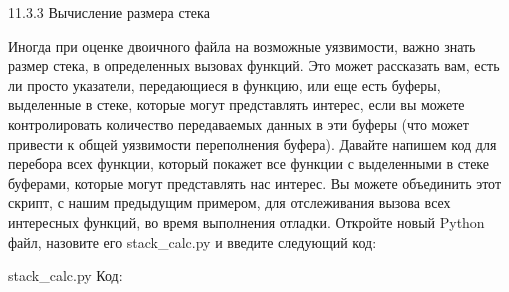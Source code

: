 \documentclass[12pt]{book}
\begin{document}
11.3.3 Вычисление размера стека

Иногда при оценке двоичного файла на возможные уязвимости, важно знать размер стека, в определенных вызовах функций. Это может рассказать вам, есть ли просто указатели, передающиеся в функцию, или еще есть буферы, выделенные в стеке, которые могут представлять интерес, если вы можете контролировать количество передаваемых данных в эти буферы (что может привести к общей уязвимости переполнения буфера). Давайте напишем код для перебора всех функции, который покажет все функции с выделенными в стеке буферами, которые могут представлять нас интерес. Вы можете объединить этот скрипт, с нашим предыдущим примером, для отслеживания вызова всех интересных функций, во время выполнения отладки. Откройте новый Python файл, назовите его stack\_calc.py и введите следующий код:

stack\_calc.py
Код:


    









\end{document}
